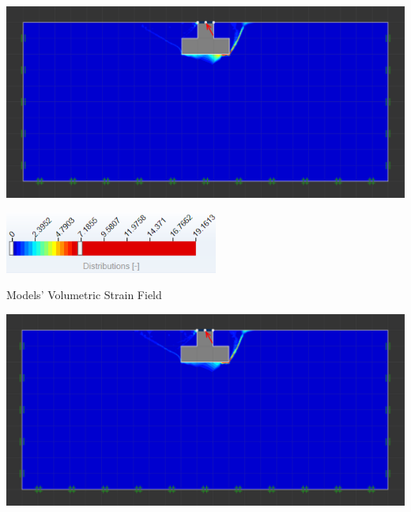\documentclass{article}
\begin{document}
\vspace{1em}

\vspace{1em}

\vspace{1em}
\begin{par}
\begin{center}
\includegraphics[width=\maxwidth{71.34972403411942em}]{image_7}
\end{center}
\end{par}

\begin{par}
\begin{center}
\includegraphics[width=7cm]{image_8}
\end{center}
\end{par}

\begin{par}
\begin{center}
Models' Volumetric Strain Field
\end{center}
\end{par}


\vspace{1em}
\begin{par}
\begin{center}
\includegraphics[width=\maxwidth{71.24937280481686em}]{image_9}
\end{center}
\end{par}
\end{document}
